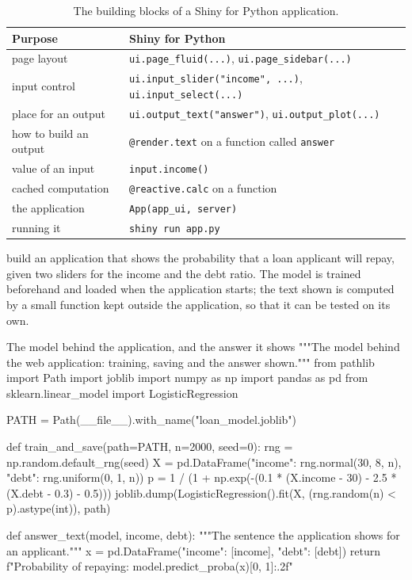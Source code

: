 \begin{table}[htbp]
\centering\small
\caption{The building blocks of a Shiny for Python application.}\label{tab:shiny}
\begin{tabular}{@{}ll@{}}
\toprule
Purpose & Shiny for Python\\
\midrule
page layout & \texttt{ui.page\_fluid(...)}, \texttt{ui.page\_sidebar(...)}\\
input control & \texttt{ui.input\_slider("income", ...)}, \texttt{ui.input\_select(...)}\\
place for an output & \texttt{ui.output\_text("answer")}, \texttt{ui.output\_plot(...)}\\
how to build an output & \texttt{@render.text} on a function called \texttt{answer}\\
value of an input & \texttt{input.income()}\\
cached computation & \texttt{@reactive.calc} on a function\\
the application & \texttt{App(app\_ui, server)}\\
running it & \texttt{shiny run app.py}\\
\bottomrule
\end{tabular}
\end{table}

 build an application that shows the probability that a loan applicant
will repay, given two sliders for the income and the debt ratio. The model is trained beforehand and
loaded when the application starts; the text shown is computed by a small function kept outside the
application, so that it can be tested on its own.

\begin{pylisting}[label={lst:loanmodel}]{The model behind the application, and the answer it shows}
"""The model behind the web application: training, saving and the answer shown."""
from pathlib import Path
import joblib
import numpy as np
import pandas as pd
from sklearn.linear_model import LogisticRegression

PATH = Path(__file__).with_name("loan_model.joblib")

def train_and_save(path=PATH, n=2000, seed=0):
    rng = np.random.default_rng(seed)
    X = pd.DataFrame({"income": rng.normal(30, 8, n), "debt": rng.uniform(0, 1, n)})
    p = 1 / (1 + np.exp(-(0.1 * (X.income - 30) - 2.5 * (X.debt - 0.3) - 0.5)))
    joblib.dump(LogisticRegression().fit(X, (rng.random(n) < p).astype(int)), path)

def answer_text(model, income, debt):
    """The sentence the application shows for an applicant."""
    x = pd.DataFrame({"income": [income], "debt": [debt]})
    return f"Probability of repaying: {model.predict_proba(x)[0, 1]:.2f}"
\end{pylisting}


